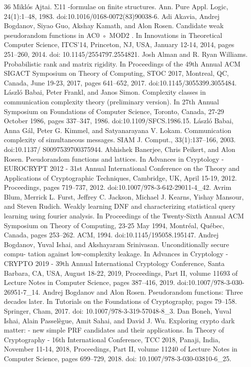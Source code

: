 \begin{thebibliography}{36}
Miklós Ajtai. Σ11 -formulae on finite structures. Ann. Pure Appl. Logic, 24(1):1–48, 1983. doi:10.1016/0168-0072(83)90038-6.
Adi Akavia, Andrej Bogdanov, Siyao Guo, Akshay Kamath, and Alon Rosen. Candidate weak pseudorandom functions in AC0 ◦ MOD2 . In Innovations in Theoretical Computer Science, ITCS’14, Princeton, NJ, USA, January 12-14, 2014, pages 251–260, 2014. doi: 10.1145/2554797.2554821.
Josh Alman and R. Ryan Williams. Probabilistic rank and matrix rigidity. In Proceedings of the 49th Annual ACM SIGACT Symposium on Theory of Computing, STOC 2017, Montreal, QC, Canada, June 19-23, 2017, pages 641–652, 2017. doi:10.1145/3055399.3055484.
László Babai, Peter Frankl, and Janos Simon. Complexity classes in communication complexity theory (preliminary version). In 27th Annual Symposium on Foundations of Computer Science, Toronto, Canada, 27-29 October 1986, pages 337–347, 1986. doi:10.1109/SFCS.1986.15.
László Babai, Anna Gál, Peter G. Kimmel, and Satyanarayana V. Lokam. Communication complexity of simultaneous messages. SIAM J. Comput., 33(1):137–166, 2003. doi:10.1137/ S0097539700375944.
Abhishek Banerjee, Chris Peikert, and Alon Rosen. Pseudorandom functions and lattices. In Advances in Cryptology - EUROCRYPT 2012 - 31st Annual International Conference on the Theory and Applications of Cryptographic Techniques, Cambridge, UK, April 15-19, 2012. Proceedings, pages 719–737, 2012. doi:10.1007/978-3-642-29011-4\_42.
Avrim Blum, Merrick L. Furst, Jeffrey C. Jackson, Michael J. Kearns, Yishay Mansour, and Steven Rudich. Weakly learning DNF and characterizing statistical query learning using fourier analysis. In Proceedings of the Twenty-Sixth Annual ACM Symposium on Theory of Computing, 23-25 May 1994, Montréal, Québec, Canada, pages 253–262. ACM, 1994. doi:10.1145/195058.195147.
Andrej Bogdanov, Yuval Ishai, and Akshayaram Srinivasan. Unconditionally secure compu- tation against low-complexity leakage. In Advances in Cryptology - CRYPTO 2019 - 39th Annual International Cryptology Conference, Santa Barbara, CA, USA, August 18-22, 2019, Proceedings, Part II, volume 11693 of Lecture Notes in Computer Science, pages 387–416, 2019. doi:10.1007/978-3-030-26951-7\_14.
Andrej Bogdanov and Alon Rosen. Pseudorandom functions: Three decades later. In Tutorials on the Foundations of Cryptography, pages 79–158. Springer, Cham, 2017. doi: 10.1007/978-3-319-57048-8\_3.
Dan Boneh, Yuval Ishai, Alain Passelègue, Amit Sahai, and David J. Wu. Exploring crypto dark matter: - new simple PRF candidates and their applications. In Theory of Cryptography - 16th International Conference, TCC 2018, Panaji, India, November 11-14, 2018, Proceedings, Part II, volume 11240 of Lecture Notes in Computer Science, pages 699–729, 2018. doi: 10.1007/978-3-030-03810-6\_25.

\end{thebibliography}
